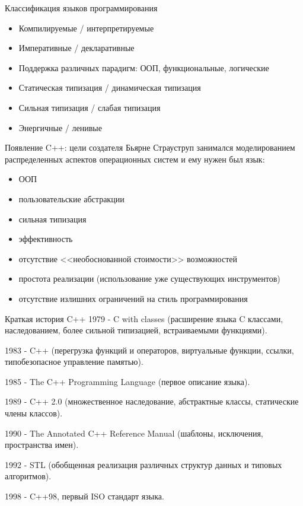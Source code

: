 \documentclass[unknownkeysallowed,xcolor=table]{beamer}
\begin{document}
\begin{frame}{Классификация языков программирования}
  \begin{itemize}
    \item Компилируемые / интерпретируемые \vspace{1em}
    \item Императивные / декларативные \vspace{1em}
    \item Поддержка различных парадигм: ООП, функциональные, логические \vspace{1em}
    \item Статическая типизация / динамическая типизация \vspace{1em}
    \item Сильная типизация / слабая типизация \vspace{1em}
    \item Энергичные / ленивые
  \end{itemize}
\end{frame}

\begin{frame}{Появление C++: цели создателя}
  Бьярне Страуструп занимался моделированием распределенных аспектов операционных систем и ему нужен был язык:
  \begin{itemize}
    \item ООП
    \item пользовательские абстракции
    \item сильная типизация
    \item эффективность
    \item отсутствие <<необоснованной стоимости>> возможностей
    \item простота реализации (использование уже существующих инструментов)
    \item отсутствие излишних ограничений на стиль программирования
  \end{itemize}
\end{frame}

\begin{frame}{Краткая история C++}
  1979 - C with classes (расширение языка C классами, наследованием, более сильной типизацией, встраиваемыми функциями).

  1983 - C++ (перегрузка функций и операторов, виртуальные функции, ссылки, типобезопасное управление памятью).

  1985 - The C++ Programming Language (первое описание языка).

  1989 - C++ 2.0 (множественное наследование, абстрактные классы, статические члены классов).

  1990 - The Annotated C++ Reference Manual (шаблоны, исключения, пространства имен).

  1992 - STL (обобщенная реализация различных структур данных и типовых алгоритмов).

  1998 - C++98, первый ISO стандарт языка.
\end{frame}
\end{document}
